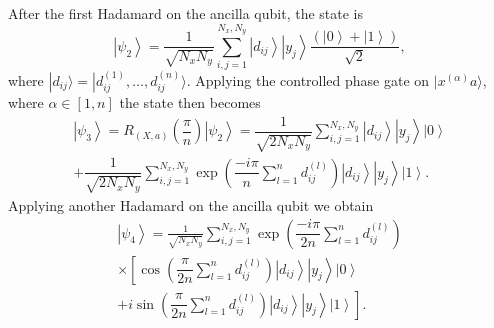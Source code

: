 \documentclass[%
  pra, aps, physrev,
  showkeys,
  twocolumn,
  showpacs,
  superscriptaddress,
  amsmath,amssymb,
  10pt
]{revtex4-2}
\begin{document}
After the first Hadamard on the ancilla qubit, the state is
%
\begin{equation}
    \left| \psi_2 \right\rangle =
    \frac{1}{\sqrt{N_x N_y}}\sum\limits_{i, j=1}^{N_x,N_y}
    \left| d_{ij} \right\rangle
    \left| y_j \right\rangle
    \dfrac{(\left| 0 \right\rangle + \left| 1 \right\rangle)}{\sqrt{2}},
\end{equation}
%
where $| d_{ij} \rangle = | d_{ij}^{(1)},\ldots,d_{ij}^{(n)} \rangle$.
Applying the controlled phase gate on $| x^{(\alpha)} a \rangle$, where $\alpha \in  [1,n]$  the state then becomes
%
\begin{multline}
    \left| \psi_3 \right\rangle = R_{(X,a)}\left(\dfrac{\pi}{n}\right)\left| \psi_2 \right\rangle
     = \dfrac{1}{\sqrt{2 N_x N_y}}
        \sum\limits_{i, j=1}^{N_x,N_y}
        \left| d_{ij} \right\rangle
        \left| y_j \right\rangle
        \left| 0 \right\rangle
        \\ + \dfrac{1}{\sqrt{2 N_x N_y}}
        \sum\limits_{i, j=1}^{N_x,N_y}
        \exp\left(\dfrac{-i \pi}{n}\sum\limits_{l=1}^n d^{(l)}_{ij} \right)
        \left| d_{ij} \right\rangle
        \left| y_j \right\rangle
        \left| 1 \right\rangle .
\end{multline}
%
Applying another Hadamard on the ancilla qubit we obtain
%
\begin{multline}
    \left| \psi_4 \right\rangle =
    \frac{1}{\sqrt{N_x N_y}}\sum\limits_{i, j=1}^{N_x,N_y}
    \exp \left(\dfrac{-i \pi}{2n}\sum\limits_{l=1}^n d^{(l)}_{ij} \right)
    \\ \times
        \left[ \cos\left(\dfrac{\pi}{2n}\sum\limits_{l=1}^n d^{(l)}_{ij} \right)
        \left| d_{ij} \right\rangle
        \left| y_j \right\rangle
        \left| 0 \right\rangle\right.
        \\+
        \left. i \sin\left(\dfrac{\pi}{2n}\sum\limits_{l=1}^n d^{(l)}_{ij} \right)
        \left| d_{ij} \right\rangle
        \left| y_j \right\rangle
        \left| 1 \right\rangle\right] .
\end{multline}
%
\end{document}
